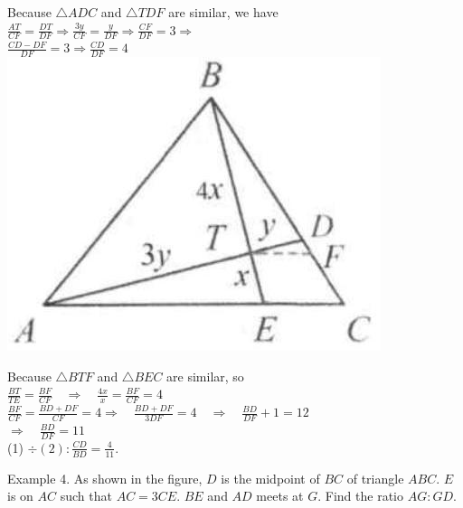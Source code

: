 \documentclass[10pt]{article}
\begin{document}
Because \(\triangle A D C\) and \(\triangle T D F\) are similar, we have\\
\(\frac{A T}{C F}=\frac{D T}{D F} \Rightarrow \frac{3 y}{C F}=\frac{y}{D F} \Rightarrow \frac{C F}{D F}=3 \Rightarrow\)\\
\(\frac{C D-D F}{D F}=3 \Rightarrow \frac{C D}{D F}=4\)\\
\includegraphics[max width=\textwidth, center]{2025_04_17_97bc1f7e44d93c271a88g-105}

Because \(\triangle B T F\) and \(\triangle B E C\) are similar, so\\
\(\frac{B T}{T E}=\frac{B F}{C F} \quad \Rightarrow \quad \frac{4 x}{x}=\frac{B F}{C F}=4\)\\
\(\frac{B F}{C F}=\frac{B D+D F}{C F}=4 \Rightarrow \quad \frac{B D+D F}{3 D F}=4 \quad \Rightarrow \quad \frac{B D}{D F}+1=12\)\\
\(\Rightarrow \quad \frac{B D}{D F}=11\)\\
(1) \(\div(2): \frac{C D}{B D}=\frac{4}{11}\).

Example 4. As shown in the figure, \(D\) is the midpoint of \(B C\) of triangle \(A B C\). \(E\) is on \(A C\) such that \(A C=3 C E\). \(B E\) and \(A D\) meets at \(G\). Find the ratio \(A G: G D\).
\end{document}
